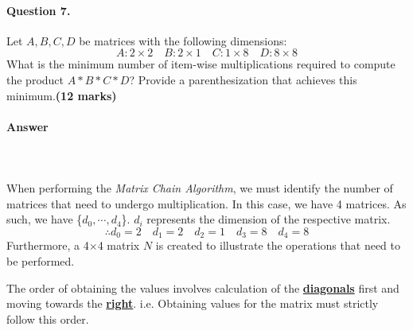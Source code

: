 \documentclass[12pt]{article}
\begin{document}
\paragraph{Question 7.} Let $A,B,C,D$ be matrices with the following dimensions:
\begin{equation*}
A:2\times 2\quad B:2\times 1\quad C:1\times 8\quad D:8\times 8 
\end{equation*}
What is the minimum number of item-wise multiplications required to compute the product $A\ast B\ast C\ast D$? Provide a parenthesization that achieves this minimum.\hfill {\bf (12 marks)}
\paragraph{Answer}\mbox{}\\\\When performing the \textit{Matrix Chain Algorithm}, we must identify the number of matrices that need to undergo multiplication. In this case, we have 4 matrices. As such, we have \{$d_0,\cdots,d_4$\}. $d_i$ represents the dimension of the respective matrix.
\begin{equation*}
\therefore d_0=2\quad d_1=2\quad d_2=1\quad d_3=8\quad d_4=8
\end{equation*} Furthermore, a 4$\times$4 matrix $N$ is created to illustrate the operations that need to be performed.
\begin{figure}[H]
\centering
{}
\end{figure}
\noindent
The order of obtaining the values involves calculation of the \textbf{\underline{diagonals}} first and moving towards the \textbf{\underline{right}}. i.e. Obtaining values for the matrix must strictly follow this order.
\end{document}
